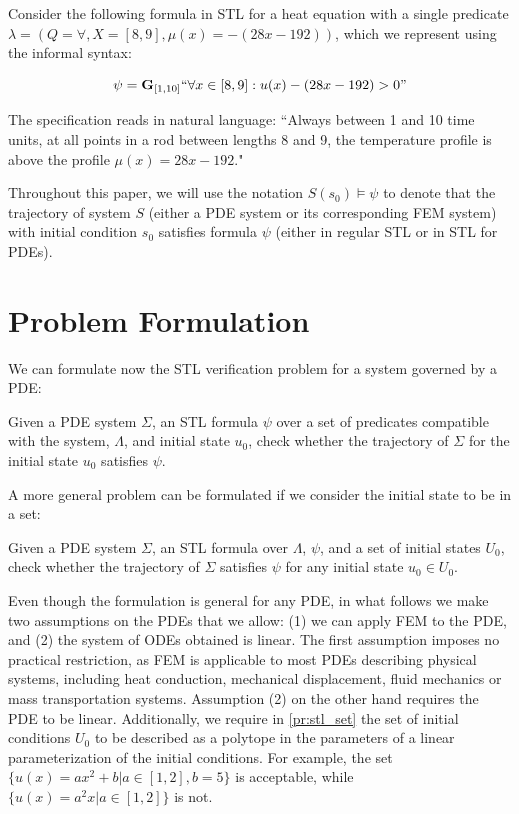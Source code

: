 \documentclass[oribibl]{llncs/llncs}
\newcommand{\Always}{\mathbf{G}}
\begin{document}
\begin{example}
    \label{ex:stl}

    Consider the following formula in STL for a heat equation with a single predicate
    $\lambda = (Q = \forall, X = [8, 9], \mu(x) = -(28x - 192))$, which we 
    represent using the informal syntax:

    \begin{equation}
        \psi = \Always_{[1,10]} ``\forall x \in [8,9] : u(x) - (28x - 192) > 0"
    \end{equation}

    The specification reads in natural language: ``Always between 1 and 10 time
    units, at all points in a rod between lengths 8 and 9, the temperature
    profile is above the profile $\mu(x) = 28x - 192$."

\end{example}

Throughout this paper, we will use the notation $S(s_0) \models \psi$ to denote
that the trajectory of system $S$ (either a PDE system or its corresponding FEM
system) with initial condition $s_0$ satisfies formula $\psi$ (either in regular STL or in
STL for PDEs).

\section{Problem Formulation}
\label{sec:problem_formulation}

We can formulate now the STL verification problem for a system governed by a
PDE:

\begin{problem}
\label{pr:stl}
    Given a PDE system $\Sigma$, an STL formula $\psi$ over a set of predicates
    compatible with the system, $\Lambda$, and initial state $u_0$,
    check whether the trajectory of $\Sigma$ for the initial state $u_0$
    satisfies $\psi$.
\end{problem}

A more general problem can be formulated if we consider the initial state to be
in a set:

\begin{problem}
\label{pr:stl_set}
    Given a PDE system $\Sigma$, an STL formula over $\Lambda$, $\psi$, and a set of initial states
    $U_0$, check whether the trajectory of $\Sigma$ satisfies $\psi$ 
    for any initial state $u_0 \in U_0$.
\end{problem}

Even though the formulation is general for any PDE, in what follows we make two
assumptions on the PDEs that we allow: (1) we can apply FEM to the PDE, and (2)
the system of ODEs obtained is linear. The first assumption imposes no practical
restriction, as FEM is applicable to most PDEs describing physical systems,
including heat conduction, mechanical displacement, fluid mechanics or
mass transportation systems. Assumption (2) on the other hand requires the PDE
to be linear. Additionally, we require in \cref{pr:stl_set} the set of initial
conditions $U_0$ to be described as a polytope in the parameters of a
linear parameterization of the initial conditions. For example, the set $\{u(x)
= a x^2 + b | a \in [1,2], b = 5\}$ is acceptable, while $\{u(x) = a^2 x |
a \in [1,2]\}$ is not.
\end{document}
